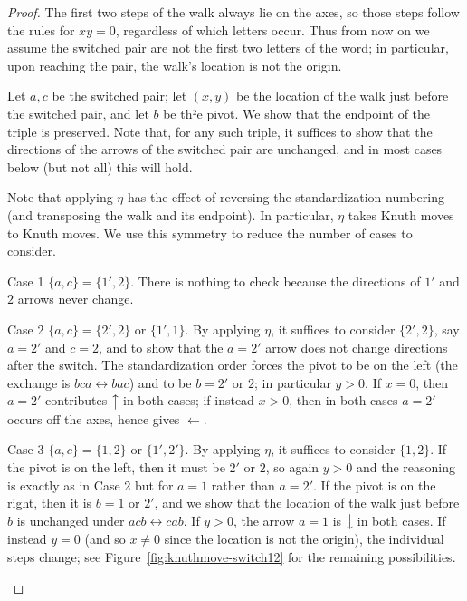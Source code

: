 \documentclass[ALCO,ThmDefs,Unicode,epreuves]{cedram}
\newcommand{\west}[1]{\ensuremath{\xleftarrow{\ #1\ }}}
\newcommand{\north}[1]{\ensuremath{\big \uparrow \!\text{\raisebox{.1ex}{\scriptsize $#1$}}}}
\newcommand{\south}[1]{\ensuremath{\big \downarrow \!\text{\raisebox{.1ex}{\scriptsize $#1$}}}}
\begin{document}
\begin{proof}
The first two steps of the walk always lie on the axes, so those steps follow the rules for $xy = 0$, regardless of which letters occur. Thus from now on we assume the switched pair are not the first two letters of the word; in particular, upon reaching the pair, the walk's location is not the origin.

Let $a,c$ be the switched pair; let $(x,y)$ be the location of the walk just before the switched pair, and let $b$ be th²e pivot. We show that the endpoint of the triple is preserved. Note that, for any such triple, it suffices to show that the directions of the arrows of the switched pair are unchanged, and in most cases below (but not all) this will hold.

Note that applying $\eta$ has the effect of reversing the standardization numbering (and transposing the walk and its endpoint). In particular, $\eta$ takes Knuth moves to Knuth moves. We use this symmetry to reduce the number of cases to consider.

\begin{enonce*}[remark]{Case 1} $\{a,c\} = \{1',2\}$. There is nothing to check because the directions of $1'$ and $2$ arrows never change.
\end{enonce*}

\begin{enonce*}[remark]{Case 2} $\{a,c\} = \{2',2\}$ or $\{1',1\}$. By applying $\eta$, it suffices to consider $\{2',2\}$, say $a=2'$ and $c=2$, and to show that the $a=2'$ arrow does not change directions after the switch. The standardization order forces the pivot to be on the left (\ie the exchange is $bca \leftrightarrow bac$) and to be $b = 2'$ or $2$; in particular $y>0$. If $x=0$, then $a=2'$ contributes $\north{}$ in both cases; if instead $x>0$, then in both cases $a=2'$ occurs off the axes, hence gives $\west{}$.
\end{enonce*}

\begin{enonce*}[remark]{Case 3} $\{a,c\} = \{1,2\}$ or $\{1',2'\}$. By applying $\eta$, it suffices to consider $\{1,2\}$. If the pivot is on the left, then it must be $2'$ or $2$, so again $y>0$ and the reasoning is exactly as in Case 2 but for $a=1$ rather than $a=2'$. If the pivot is on the right, then it is $b=1$ or $2'$, and we show that the location of the walk just before $b$ is unchanged under $acb\leftrightarrow cab$. If $y>0$, the arrow $a=1$ is $\south{}$ in both cases. If instead $y=0$ (and so $x \ne 0$ since the location is not the origin), the individual steps change; see Figure~\ref{fig:knuthmove-switch12} for the remaining possibilities. 


\end{enonce*}
\end{proof}
\end{document}
